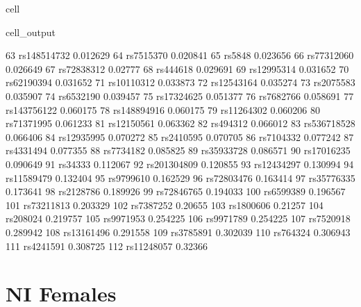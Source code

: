\documentclass[letterpaper,10pt,english]{jupyterBook}
\begin{document}
\begin{sphinxuseclass}{cell}
\begin{sphinxVerbatimOutput}
\begin{sphinxuseclass}{cell_output}
\begin{sphinxVerbatim}[commandchars=\\\{\}]
63      rs148514732    0.012629
64        rs7515370    0.020841
65           rs5848    0.023656
66       rs77312060    0.026649
67       rs72838312     0.02777
68         rs444618    0.029691
69       rs12995314    0.031652
70       rs62190394    0.031652
71       rs10110312    0.033873
72       rs12543164    0.035274
73        rs2075583    0.035907
74        rs6532190    0.039457
75       rs17324625    0.051377
76        rs7682766    0.058691
77      rs143756122    0.060175
78      rs148894916    0.060175
79       rs11264302    0.060206
80       rs71371995    0.061233
81       rs12150561    0.063362
82         rs494312    0.066012
83      rs536718528    0.066406
84       rs12935995    0.070272
85        rs2410595    0.070705
86        rs7104332    0.077242
87        rs4331494    0.077355
88        rs7734182    0.085825
89       rs35933728    0.086571
90       rs17016235    0.090649
91          rs34333    0.112067
92      rs201304809    0.120855
93       rs12434297    0.130994
94       rs11589479    0.132404
95        rs9799610    0.162529
96       rs72803476    0.163414
97       rs35776335    0.173641
98        rs2128786    0.189926
99       rs72846765    0.194033
100       rs6599389    0.196567
101      rs73211813    0.203329
102       rs7387252     0.20655
103       rs1800606     0.21257
104        rs208024    0.219757
105       rs9971953    0.254225
106       rs9971789    0.254225
107       rs7520918    0.289942
108      rs13161496    0.291558
109       rs3785891    0.302039
110        rs764324    0.306943
111       rs4241591    0.308725
112      rs11248057     0.32366
\end{sphinxVerbatim}

\end{sphinxuseclass}\end{sphinxVerbatimOutput}

\end{sphinxuseclass}

\section{NI Females}
\label{\detokenize{Cooper:ni-females}}
\end{document}

